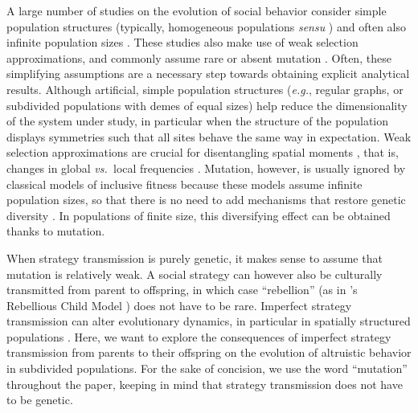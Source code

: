 \documentclass[11pt, letterpaper]{article}
\newcommand{\eg}{\textit{e.g.}}
\newcommand{\vs}{\textit{vs.\ }}
\begin{document}
A large number of studies on the evolution of social behavior consider simple population structures (typically, homogeneous populations \textit{sensu} \citet[][]{TaylorDayWild2007}) and often also infinite population sizes \citep[but see][for results on any structure]{Allen2017}. 
These studies also make use of weak selection approximations, and commonly assume rare \citep[\eg,][]{LeturqueRousset2002, Taylor2007JTB, TarnitaTaylor2014} or absent mutation \citep[for models assuming infinite population sizes, or models concentrating on fixation probabilities][for recent reviews]{LehmannRousset2014,VanCleve2015}. 
Often, these simplifying assumptions are a necessary step towards obtaining explicit analytical results. 
Although artificial, simple population structures (\eg, regular graphs, or subdivided populations with demes of equal sizes) help reduce the dimensionality of the system under study, in particular when the structure of the population displays symmetries such that all sites behave the same way in expectation. 
Weak selection approximations are crucial for disentangling spatial moments \citep{Lion2016}, that is, changes in global \vs local frequencies \citep[though they can in some cases be relaxed, as in][]{MullonLehmann2014}. 
Mutation, however, is usually ignored by classical models of inclusive fitness because these models assume infinite population sizes, so that there is no need to add mechanisms that restore genetic diversity \citep{TarnitaTaylor2014}. In populations of finite size,  this diversifying effect can be obtained thanks to mutation. %

When strategy transmission is purely genetic, it makes sense to assume that mutation is relatively weak. A social strategy can however also be culturally transmitted from parent to offspring, in which case ``rebellion'' (as in \citeauthor{Frank1997}'s Rebellious Child Model \citep{Frank1997}) does not have to be rare. Imperfect strategy transmission can alter evolutionary dynamics, in particular in spatially structured populations \citep[see \eg,][for graph-structured populations]{Allen2012,Debarre2017}. Here, we want to explore the consequences of imperfect strategy transmission from parents to their offspring on the evolution of altruistic behavior in subdivided populations. For the sake of concision, we use the word ``mutation'' throughout the paper, keeping in mind that strategy transmission does not have to be genetic. 
\end{document}
